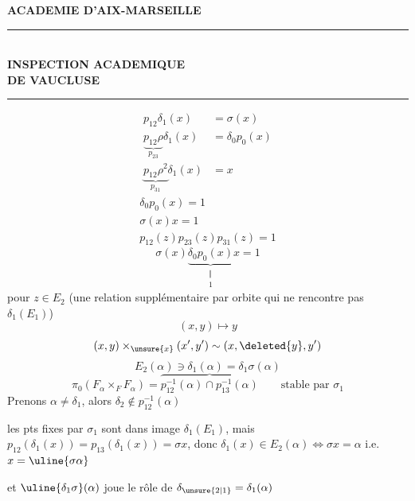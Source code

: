 
\textbf{ACADEMIE D'AIX-MARSEILLE}\\
\rule{3cm}{.4pt}\\
\textbf{INSPECTION ACADEMIQUE}\\
\textbf{DE VAUCLUSE}\\
\rule{1cm}{.4pt}
\[\begin{aligned}
p_{12}\delta_1(x)&=\sigma(x)\\
\underbrace{p_{12}\rho}_{p_{23}}\delta_1(x)&=\delta_0p_0(x)\\
\underbrace{p_{12}\rho^2}_{p_{31}}\delta_1(x)&=x
\end{aligned}\]
\[\boxed{\begin{gathered}
\delta_0p_0(x)=1\\
\sigma(x)x=1\\[.5em]
p_{12}(z)p_{23}(z)p_{31}(z)=1
\end{gathered}}\]
\[\sigma(x)\underbrace{\delta_0p_0(x)}_{\substack{\Vert\\1}}x=1\]
pour $z\in E_2$ (une relation  supplémentaire par orbite  qui ne rencontre pas $\delta_1(E_1)$)
\[(x,y)\mapsto y\]
\[(x,y)\times_{\unsure{x}}(x',y')\sim(x,\deleted{y},y')\]
\[E_2(\alpha)\ni\delta_1(\alpha)=\delta_1\sigma(\alpha)\]
\[\pi_0(F_\alpha\times_F F_\alpha)=\overbrace{p_{12}^{-1}(\alpha)\cap p_{13}^{-1}(\alpha)}\qquad\text{stable par }\sigma_1\]
Prenons $\alpha\ne\delta_1$, alors $\delta_2\notin p_{12}^{-1}(\alpha)$

les pts fixes par $\sigma_1$ sont dans image $\delta_1(E_1)$, mais $p_{12}(\delta_1(x))=p_{13}(\delta_1(x))=\sigma x$, donc 
 $\delta_1(x)\in E_2(\alpha)\Longleftrightarrow\sigma x=\alpha$ i.e. $x=\uline{\sigma\alpha}$

et $\uline{\delta_1\sigma}(\alpha)$ joue le rôle de $\delta_{\unsure{2|1}}=\delta_1(\alpha)$
